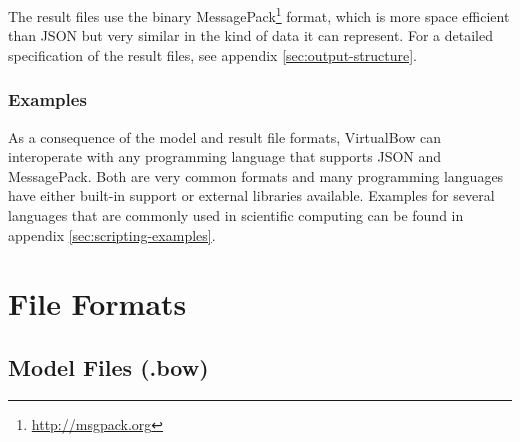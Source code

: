 \documentclass[12pt]{article}
\begin{document}
The result files use the binary MessagePack\footnote{\url{http://msgpack.org}} format, which is more space efficient than JSON but very similar in the kind of data it can represent. For a detailed specification of the result files, see appendix \ref{sec:output-structure}.

\subsubsection*{Examples}

As a consequence of the model and result file formats, VirtualBow can interoperate with any programming language that supports JSON and MessagePack.
Both are very common formats and many programming languages have either built-in support or external libraries available.
Examples for several languages that are commonly used in scientific computing can be found in appendix \ref{sec:scripting-examples}.

\bigskip

\appendix

\newpage
\section{File Formats}

\subsection{Model Files (.bow)}
\label{sec:input-structure}

\newcommand{\tablespace}{\rule{0pt}{3ex}}
\end{document}
